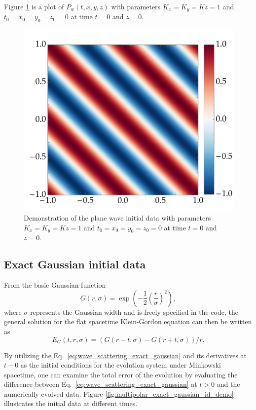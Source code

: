 Figure \ref{fig:multipolar_plane_wave_id_demo} is a plot of $P_w(t,x,y,z)$ with parameters $K_x = K_y = Kz = 1$ and $t_0 = x_0 = y_0 = z_0 = 0$ at time $t=0$ and $z=0$.

\begin{figure}[!ht]
  \centering
  \includegraphics[width=0.5\linewidth]{img/wave_scattering/plane_wave_id_examples.png}
  \caption{Demonstration of the plane wave initial data with parameters $K_x = K_y = Kz = 1$ and $t_0 = x_0 = y_0 = z_0 = 0$ at time $t=0$ and $z=0$.}
  \label{fig:multipolar_plane_wave_id_demo}
\end{figure}

\subsection{Exact Gaussian initial data}

From the basic Gaussian function
%
\begin{equation}
  G(r, \sigma) = \exp\left( -\frac{1}{2} \left( \frac{r}{\sigma} \right)^2  \right),
  \label{eq:wave_scattering_gaussian}
\end{equation}
%
where $\sigma$ represents the Gaussian width and is freely specified in the code, the general solution for the flat spacetime Klein-Gordon equation can then be written as
\begin{equation}
  E_G(t, r, \sigma) = \left( G(r-t, \sigma) - G(r+t, \sigma) \right) / r.
  \label{eq:wave_scattering_exact_gaussian}
\end{equation}

By utilizing the Eq.~\eqref{eq:wave_scattering_exact_gaussian} and its derivatives at $t-0$ as the initial conditions for the evolution system under Minkowski spacetime, one can examine the total error of the evolution by evaluating the difference between Eq.~\eqref{eq:wave_scattering_exact_gaussian} at $t>0$ and the numerically evolved data. Figure \ref{fig:multipolar_exact_gaussian_id_demo} illustrates the initial data at different times.

